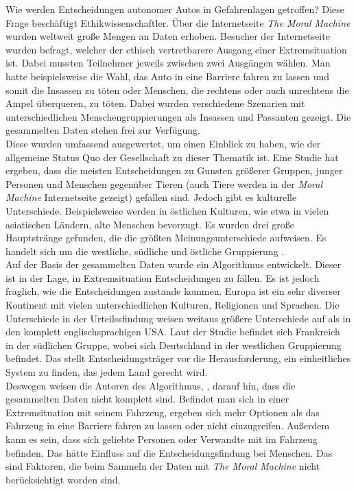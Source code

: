 Wie werden Entscheidungen autonomer Autos in Gefahrenlagen getroffen? Diese Frage beschäftigt Ethikwissenschaftler. Über die Internetseite \textit{The Moral Machine} wurden weltweit große Mengen an Daten erhoben. Besucher der Internetseite wurden befragt, welcher der ethisch vertretbarere Ausgang einer Extremsituation ist. Dabei mussten Teilnehmer jeweils zwischen zwei Ausgängen wählen. Man hatte beispielsweise die Wahl, das Auto in eine Barriere fahren zu lassen und somit die Insassen zu töten oder Menschen, die rechtens oder auch unrechtens die Ampel überqueren, zu töten. Dabei wurden verschiedene Szenarien mit unterschiedlichen Menschengruppierungen als Insassen und Passanten gezeigt. Die gesammelten Daten stehen frei zur Verfügung.\\

Diese wurden umfassend ausgewertet, um einen Einblick zu haben, wie der allgemeine Status Quo der Gesellschaft zu dieser Thematik ist. Eine Studie hat ergeben, dass die meisten Entscheidungen zu Gunsten größerer Gruppen, junger Personen und Menschen gegenüber Tieren (auch Tiere werden in der \textit{Moral Machine} Internetseite gezeigt) gefallen sind. Jedoch gibt es kulturelle Unterschiede. Beispielsweise werden in östlichen Kulturen, wie etwa in vielen asiatischen Ländern, alte Menschen bevorzugt. Es wurden drei große Hauptstränge gefunden, die die größten Meinungsunterschiede aufweisen. Es handelt sich um die westliche, südliche und östliche Gruppierung \cite{moralMachine}.\\

Auf der Basis der gesammelten Daten wurde ein Algorithmus \cite{votingBasedSystem} entwickelt. Dieser ist in der Lage, in Extremsituation Entscheidungen zu fällen. Es ist jedoch fraglich, wie die Entscheidungen zustande kommen. Europa ist ein sehr diverser Kontinent mit vielen unterschiedlichen Kulturen, Religionen und Sprachen. Die Unterschiede in der Urteilssfindung weisen weitaus größere Unterschiede auf als in den komplett englischsprachigen USA. Laut der Studie befindet sich Frankreich in der südlichen Gruppe, wobei sich Deutschland in der westlichen Gruppierung befindet. Das stellt Entscheidungsträger vor die Herausforderung, ein einheitliches System zu finden, das jedem Land gerecht wird.\\

Deswegen weisen die Autoren des Algorithmus, \citeauthor{votingBasedSystem}, darauf hin, dass die gesammelten Daten nicht komplett sind. Befindet man sich in einer Extremsituation mit seinem Fahrzeug, ergeben sich mehr Optionen als das Fahrzeug in eine Barriere fahren zu lassen oder nicht einzugreifen. Außerdem kann es sein, dass sich geliebte Personen oder Verwandte mit im Fahrzeug befinden. Das hätte Einfluss auf die Entscheidungsfindung bei Menschen. Das sind Faktoren, die beim Sammeln der Daten mit \textit{The Moral Machine} nicht berücksichtigt worden sind.\\

